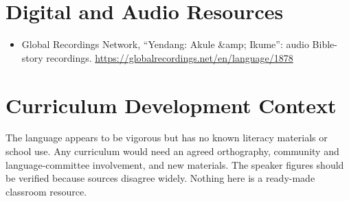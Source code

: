 \documentclass[12pt]{article}
\begin{document}
\section{Digital and Audio Resources}
\begin{itemize}
\item Global Recordings Network, ``Yendang: Akule \&amp; Ikume'': audio Bible-story recordings. \url{https://globalrecordings.net/en/language/1878}
\end{itemize}

\section{Curriculum Development Context}
The language appears to be vigorous but has no known literacy materials or school use. Any curriculum would need an agreed orthography, community and language-committee involvement, and new materials. The speaker figures should be verified because sources disagree widely. Nothing here is a ready-made classroom resource.
\end{document}
